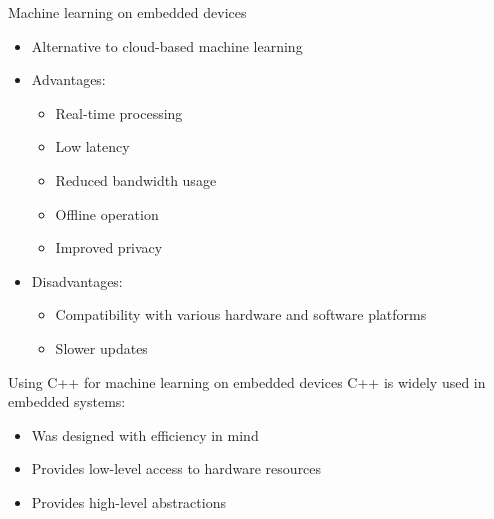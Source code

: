 \begin{frame}{Machine learning on embedded devices}
  \begin{itemize}
	\item Alternative to cloud-based machine learning
	\item Advantages:
	  \begin{itemize}
		\item Real-time processing
		\item Low latency
		\item Reduced bandwidth usage
		\item Offline operation
		\item Improved privacy
	  \end{itemize}
	\item Disadvantages:
	  \begin{itemize}
		\item Compatibility with various hardware and software platforms
		\item Slower updates
	  \end{itemize}
  \end{itemize}
\end{frame}

\begin{frame}{Using C++ for machine learning on embedded devices}
C++ is widely used in embedded systems:
  \begin{itemize}
	\item Was designed with efficiency in mind
	\item Provides low-level access to hardware resources
	\item Provides high-level abstractions
  \end{itemize}
\end{frame}

